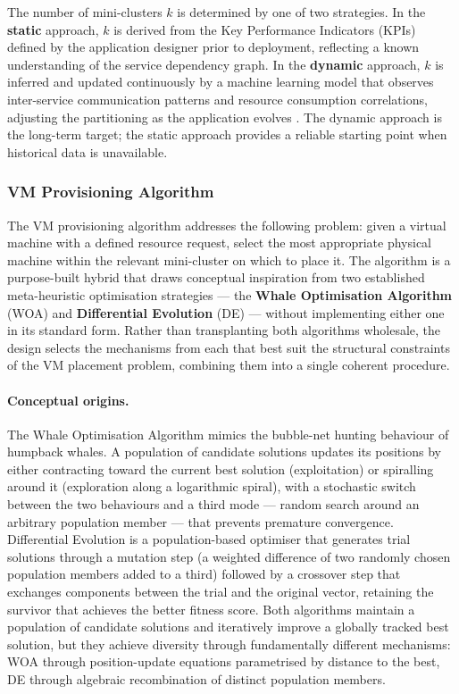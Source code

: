 \documentclass[a4paper, 12pt]{report}
\begin{document}
The number of mini-clusters $k$ is determined by one of two strategies.
In the \textbf{static} approach, $k$ is derived from the Key Performance
Indicators (KPIs) defined by the application designer prior to deployment,
reflecting a known understanding of the service dependency graph.  In
the \textbf{dynamic} approach, $k$ is inferred and updated continuously
by a machine learning model that observes inter-service communication
patterns and resource consumption correlations, adjusting the
partitioning as the application evolves \cite{meng2020survey}.  The
dynamic approach is the long-term target; the static approach provides
a reliable starting point when historical data is unavailable.
 
\subsubsection{VM Provisioning Algorithm}

The VM provisioning algorithm addresses the following problem: given a
virtual machine with a defined resource request, select the most
appropriate physical machine within the relevant mini-cluster on which
to place it.  The algorithm is a purpose-built hybrid that draws
conceptual inspiration from two established meta-heuristic optimisation
strategies --- the \textbf{Whale Optimisation Algorithm} (WOA) and
\textbf{Differential Evolution} (DE) --- without implementing either one
in its standard form.  Rather than transplanting both algorithms
wholesale, the design selects the mechanisms from each that best suit
the structural constraints of the VM placement problem, combining them
into a single coherent procedure.

\paragraph{Conceptual origins.}
The Whale Optimisation Algorithm \cite{mirjalili2016woa} mimics the
bubble-net hunting behaviour of humpback whales.  A population of
candidate solutions updates its positions by either contracting toward
the current best solution (exploitation) or spiralling around it
(exploration along a logarithmic spiral), with a stochastic switch
between the two behaviours and a third mode --- random search around an
arbitrary population member --- that prevents premature convergence.
Differential Evolution \cite{storn1997de} is a population-based
optimiser that generates trial solutions through a mutation step (a
weighted difference of two randomly chosen population members added to a
third) followed by a crossover step that exchanges components between
the trial and the original vector, retaining the survivor that achieves
the better fitness score.  Both algorithms maintain a population of
candidate solutions and iteratively improve a globally tracked best
solution, but they achieve diversity through fundamentally different
mechanisms: WOA through position-update equations parametrised by
distance to the best, DE through algebraic recombination of distinct
population members.
\end{document}
